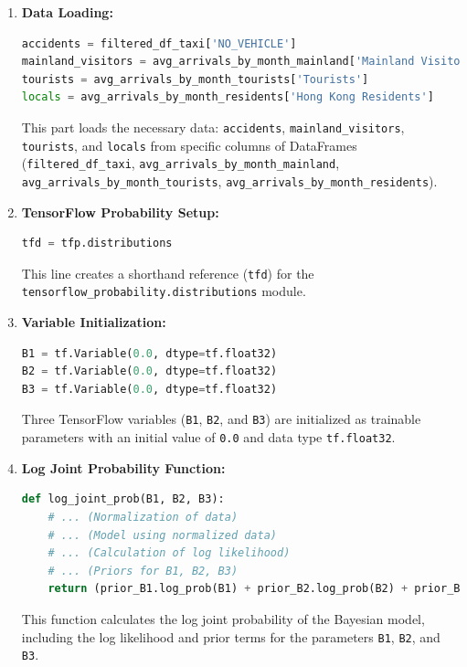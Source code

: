 \documentclass{article}
\begin{document}
\begin{enumerate}
    \item \textbf{Data Loading:}
\begin{lstlisting}[language=Python, caption={Data Loading}, label={lst:data_loading}]
accidents = filtered_df_taxi['NO_VEHICLE']
mainland_visitors = avg_arrivals_by_month_mainland['Mainland Visitors']
tourists = avg_arrivals_by_month_tourists['Tourists']
locals = avg_arrivals_by_month_residents['Hong Kong Residents']
\end{lstlisting}
This part loads the necessary data: \texttt{accidents}, \texttt{mainland\_visitors}, \texttt{tourists}, and \texttt{locals} from specific columns of DataFrames (\texttt{filtered\_df\_taxi}, \texttt{avg\_arrivals\_by\_month\_mainland}, \texttt{avg\_arrivals\_by\_month\_tourists}, \texttt{avg\_arrivals\_by\_month\_residents}).

    \item \textbf{TensorFlow Probability Setup:}
\begin{lstlisting}[language=Python, caption={TensorFlow Probability Setup}, label={lst:tfp_setup}]
tfd = tfp.distributions
\end{lstlisting}
This line creates a shorthand reference (\texttt{tfd}) for the \texttt{tensorflow\_probability.distributions} module.

    \item \textbf{Variable Initialization:}
\begin{lstlisting}[language=Python, caption={Variable Initialization}, label={lst:variable_init}]
B1 = tf.Variable(0.0, dtype=tf.float32)
B2 = tf.Variable(0.0, dtype=tf.float32)
B3 = tf.Variable(0.0, dtype=tf.float32)
\end{lstlisting}
Three TensorFlow variables (\texttt{B1}, \texttt{B2}, and \texttt{B3}) are initialized as trainable parameters with an initial value of \texttt{0.0} and data type \texttt{tf.float32}.

    \item \textbf{Log Joint Probability Function:}
\begin{lstlisting}[language=Python, caption={Log Joint Probability Function}, label={lst:log_joint_prob}]
def log_joint_prob(B1, B2, B3):
    # ... (Normalization of data)
    # ... (Model using normalized data)
    # ... (Calculation of log likelihood)
    # ... (Priors for B1, B2, B3)
    return (prior_B1.log_prob(B1) + prior_B2.log_prob(B2) + prior_B3.log_prob(B3) + log_likelihood)
\end{lstlisting}
This function calculates the log joint probability of the Bayesian model, including the log likelihood and prior terms for the parameters \texttt{B1}, \texttt{B2}, and \texttt{B3}.


\end{enumerate}
\end{document}
